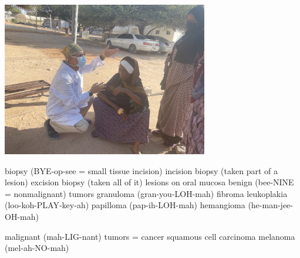 \documentclass[
paper=landscape,
paper=160mm:90mm, %
fontsize=11pt, %
pagesize, %
parskip=half-, %
]{scrartcl} %
\theoremstyle{mythmstyle} %
\begin{document}
\clearpage
\includegraphics[width=9cm]{IMG_2114.JPG}
\clearpage
\begin{minipage}[c]{0.6\linewidth}

\begin{outline}
\1 biopsy (BYE-op-see = small tissue incision)
    \2 incision biopsy (taken part of a lesion)
    \2 excision biopsy (taken all of it)
\1 lesions on oral mucosa
    \2 benign (bee-NINE = nonmalignant) tumors
        \3 granuloma (gran-you-LOH-mah)
        \3 fibroma
        \3 leukoplakia (loo-koh-PLAY-key-ah)
        \3 papilloma (pap-ih-LOH-mah)
        \3 hemangioma (he-man-jee-OH-mah)

    \2 malignant (mah-LIG-nant) tumors = cancer
        \3 squamous cell carcinoma
        \3 melanoma (mel-ah-NO-mah)
\end{outline}
\end{minipage}
\begin{minipage}[c]{0.4\linewidth}

\end{minipage}
\end{document}
